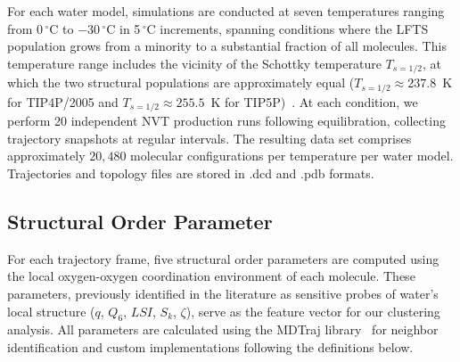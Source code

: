 \documentclass[aps, amsmath,amssymb, reprint, onecolumn,notitlepage,superscriptaddress]{revtex4-2}
\begin{document}
For each water model, simulations are conducted at seven temperatures ranging from 0\,$^{\circ}$C to $-30$\,$^{\circ}$C in 5\,$^{\circ}$C increments, spanning conditions where the LFTS population grows from a minority to a substantial fraction of all molecules. This temperature range includes the vicinity of the Schottky temperature $T_{s=1/2}$, at which the two structural populations are approximately equal ($T_{s=1/2} \approx 237.8$~K for TIP4P/2005 and $T_{s=1/2} \approx 255.5$~K for TIP5P)~\cite{shi_direct_2020}.  At each condition, we perform 20 independent NVT production runs following equilibration, collecting trajectory snapshots at regular intervals. The resulting data set comprises approximately $20{,}480$ molecular configurations per temperature per water model. Trajectories and topology files are stored in .dcd and .pdb formats.

\subsection{Structural Order Parameter}
\label{sec:structural_order_parameter}
For each trajectory frame, five structural order parameters are computed using the local oxygen-oxygen coordination environment of each molecule. These parameters, previously identified in the literature as sensitive probes of water's local structure ($q$, $Q_6$, $LSI$, $S_k$, $\zeta$), serve as the feature vector for our clustering analysis. All parameters are calculated using the MDTraj library~\cite{mcgibbon_mdtraj_2015} for neighbor identification and custom implementations following the definitions below.
\end{document}
